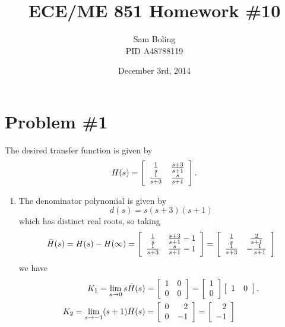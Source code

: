 \documentclass{article}
\title{ECE/ME 851 Homework \#10}
\date{December 3rd, 2014}
\author{Sam Boling \\ PID A48788119}
\begin{document}
\maketitle

\section*{Problem \#1}
The desired transfer function is given by
$$
H(s) =
\left[\begin{array}{c c}
  \frac{1}{s}   & \frac{s+3}{s+1} \\
  \frac{1}{s+3} & \frac{s}{s+1}
\end{array}\right].
$$
\begin{enumerate}
  \item{
    The denominator polynomial is given by
    $$
    d(s) = s(s+3)(s+1)
    $$
    which has distinct real roots, so taking
    $$
    \bar{H}(s) = H(s) - H(\infty) =
    \left[\begin{array}{c c}
      \frac{1}{s}   & \frac{s+3}{s+1} - 1 \\
      \frac{1}{s+3} & \frac{s}{s+1} - 1
    \end{array}\right] =
    \left[\begin{array}{c c}
      \frac{1}{s}   &  \frac{2}{s+1} \\
      \frac{1}{s+3} & -\frac{1}{s+1}
    \end{array}\right]
    $$
    we have
    \begin{align*}
      K_1 = \lim_{s \to 0} s \bar{H}(s) &=
      \left[\begin{array}{c c}
        1 & 0 \\
        0 & 0
      \end{array}\right] =
      \left[\begin{array}{c}
        1 \\
        0
      \end{array}\right]
      \left[\begin{array}{c c}
        1 & 0
      \end{array}\right], \\
      K_2 = \lim_{s \to -1} (s+1)\bar{H}(s) &=
      \left[\begin{array}{r r}
        0 &  2 \\
        0 & -1
      \end{array}\right] =
      \left[\begin{array}{r}
         2 \\
        -1
      \end{array}\right]

\end{align*}}
\end{enumerate}
\end{document}

